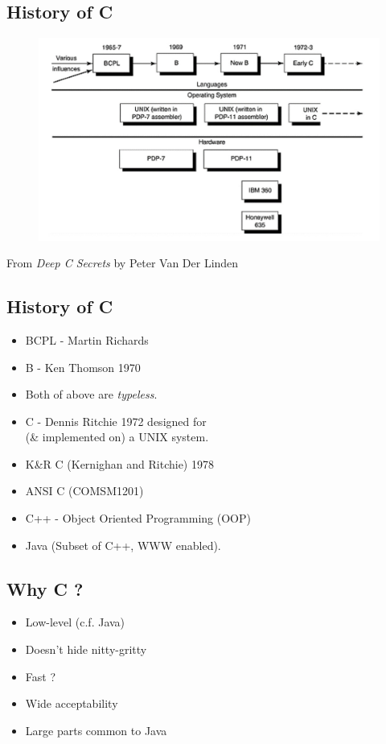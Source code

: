 \documentclass[a4,portraitt]{slides}
\begin{document}
\newpage
\subsection*{History of C}
{\samepage
\begin{center}
\begin{figure}[h]
\centerline{
\includegraphics[scale=0.5]{../Figs/evolvec.jpg}
}
\end{figure}
\end{center}
{\small
From {\it Deep C Secrets} by Peter Van Der Linden
}}

\newpage
\subsection*{History of C}
\begin{itemize}
\item BCPL - Martin Richards
\item B - Ken Thomson 1970
\item Both of above are {\em typeless}.
\item C - Dennis Ritchie 1972 designed for\\(\& implemented on) a UNIX system.
\item K\&R C (Kernighan and Ritchie) 1978
\item ANSI C (COMSM1201)
\item C++ - Object Oriented Programming (OOP)
\item Java (Subset of C++, WWW enabled).
\end{itemize}

\subsection*{Why C ?}
\begin{itemize}
\item Low-level (c.f. Java)
\item Doesn't hide nitty-gritty
\item Fast ?
\item Wide acceptability
\item Large parts common to Java
\end{itemize}
\newpage
\end{document}
